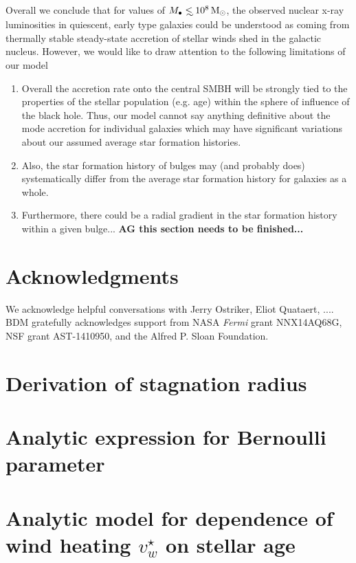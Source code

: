 \documentclass[usenatbib,fleqn]{mn2e}
\newcommand\lsim{\mathrel{\rlap{\lower4pt\hbox{\hskip1pt$\sim$}}
    \raise1pt\hbox{$<$}}}
\newcommand{\Mbh}[1][]{M_{\bullet#1}}
\newcommand{\vwO}{v_{w}}
\begin{document}
    Overall we conclude that for values of $\Mbh\lsim 10^{8} \Msun$,
    the observed nuclear x-ray luminosities in quiescent, early type
    galaxies could be understood as coming from thermally stable
    steady-state accretion of stellar winds shed in the galactic
    nucleus.  However, we would like to draw attention to the
    following limitations of our model

    \begin{enumerate}
    \item Overall the accretion rate onto the central SMBH will be strongly
    tied to the properties of the stellar population (e.g. age) within
    the sphere of influence of the black hole. Thus, our model cannot
    say anything definitive about the mode accretion for individual
    galaxies which may have significant variations about our assumed
    average star formation histories.
    \item Also, the star formation history of bulges may (and probably
      does) systematically differ from the average star formation
      history for galaxies as a whole.
    \item Furthermore, there could be a radial gradient in the star
      formation history within a given bulge... 
     {\bf AG this section needs to be finished...}
    \end{enumerate}
  

\section*{Acknowledgments}
We acknowledge helpful conversations with Jerry Ostriker, Eliot Quataert, ....  BDM gratefully acknowledges support from NASA {\it Fermi} grant NNX14AQ68G, NSF grant AST-1410950, and the Alfred P. Sloan Foundation.  

  


  \clearpage
  \appendix
  \section{Derivation of stagnation radius}
  \label{app:rs}
  

  \section{Analytic expression for Bernoulli parameter}
  \label{app:be}
  

  \section{Analytic model for dependence of wind heating $\vwO^{\star}$ on stellar age}
\label{app:windheat}


  \footnotesize{
    
    
  }
\end{document}
